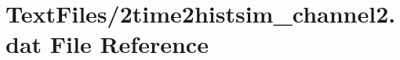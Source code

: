 \hypertarget{2time2histsim__channel2_8dat}{}\section{Text\+Files/2time2histsim\+\_\+channel2.dat File Reference}
\label{2time2histsim__channel2_8dat}
